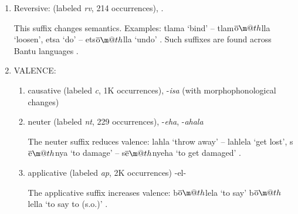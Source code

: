\documentclass[11pt,letterpaper]{article}
\makeatletter
\newcommand*{\textoverline}[1]{$\overline{\hbox{#1}}\m@th$}
\makeatother
\begin{document}
\begin{enumerate}
\item Reversive: (labeled \textit{rv}, 214 occurrences),  \cite[]{doke1967textbook}.
    
    This suffix changes semantics.
    Examples: tlama `bind' -- tlam\textoverline{o}lla `loosen', etsa `do' -- ets\textoverline{o}lla `undo' \citep[]{doke1967textbook}.
    Such suffixes are found across Bantu languages \citep{schadeberg2003derivation}.




    \item VALENCE:
    \begin{enumerate}
    \item causative (labeled \textit{c}, 1K occurrences), -\textit{isa} (with morphophonological changes) \cite[]{doke1967textbook}
    

    
    \item neuter (labeled \textit{nt}, 229 occurrences), -\textit{eha}, -\textit{ahala} \cite[]{doke1967textbook}
    
    The neuter suffix reduces valence: lahla `throw away' -- lahlela `get lost', s\textoverline{e}nya `to damage' -- s\textoverline{e}nyeha `to get damaged' \citep[]{doke1967textbook}.

    
    
    \item applicative
    (labeled \textit{ap}, 2K occurrences) -el- \cite[]{doke1967textbook}
    
    The applicative suffix increases valence: b\textoverline{o}lela `to say' b\textoverline{o}lella `to say to (s.o.)' \citep[]{doke1967textbook}.
    
    
    
    
    
    

\end{enumerate}
\end{enumerate}
\end{document}
